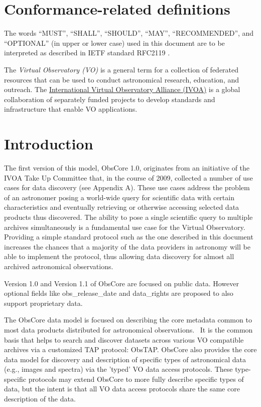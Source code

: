 \documentclass[11pt,a4paper]{ivoa}
\begin{document}
\section*{Conformance-related definitions}

The words ``MUST'', ``SHALL'', ``SHOULD'', ``MAY'', ``RECOMMENDED'', and
``OPTIONAL'' (in upper or lower case) used in this document are to be
interpreted as described in IETF standard RFC2119 \citep{std:RFC2119}.

The \emph{Virtual Observatory (VO)} is a
general term for a collection of federated resources that can be used
to conduct astronomical research, education, and outreach.
The \href{https://www.ivoa.net}{International
Virtual Observatory Alliance (IVOA)} is a global
collaboration of separately funded projects to develop standards and
infrastructure that enable VO applications.


\section{Introduction}

The first version of this model, ObsCore 1.0, originates from an initiative of the IVOA Take Up Committee that, in the
course of 2009, collected a number of use cases for data discovery (see Appendix A).  These use cases address the
problem of an astronomer posing a world-wide query for scientific data with certain characteristics and eventually
retrieving or otherwise accessing selected data products thus discovered.  The ability to pose a single scientific
query to multiple archives simultaneously is a fundamental use case for the Virtual Observatory.  Providing a simple
standard protocol such as the one described in this document increases the chances that a majority of the data
providers in astronomy will be able to implement the protocol, thus allowing data discovery for almost all archived
astronomical observations.

Version 1.0 and Version 1.1 of ObsCore are focused on public data. However optional fields like obs\_release\_date and
data\_rights are proposed to also support proprietary data.

The ObsCore data model is focused on describing the core metadata common to most data products distributed for
astronomical observations.~ It is the common basis that helps to search and discover datasets across various VO
compatible archives via a customized TAP protocol: ObsTAP.  ObsCore also provides the core data model for discovery and
description of specific types of astronomical data (e.g., images and spectra) via the 'typed' VO data access
protocols.  These type-specific protocols may extend ObsCore to more fully describe specific types of data, but the
intent is that all VO data access protocols share the same core description of the data.
\end{document}
